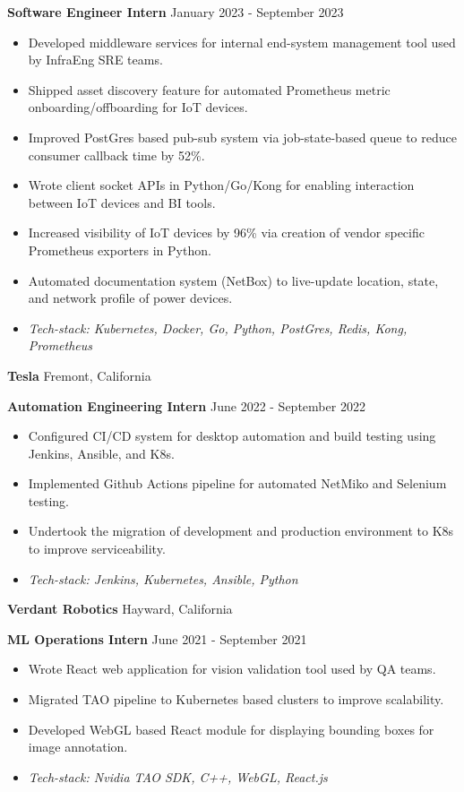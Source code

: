 \documentclass[11pt]{article}
\begin{document}
\textbf{Software Engineer Intern} \hfill January 2023 - September 2023
\begin{itemize}[noitemsep, topsep=0pt, partopsep=0pt, parsep=0pt]
    \item Developed middleware services for internal end-system management tool used by InfraEng SRE teams.
    \item Shipped asset discovery feature for automated Prometheus metric onboarding/offboarding for IoT devices. 
    \item Improved PostGres based pub-sub system via job-state-based queue to reduce consumer callback time by 52\%.
    \item Wrote client socket APIs in Python/Go/Kong for enabling interaction between IoT devices and BI tools.
    \item Increased visibility of IoT devices by 96\% via creation of vendor specific Prometheus exporters in Python.
    \item Automated documentation system (NetBox) to live-update location, state, and network profile of power devices.
    \item \textit{Tech-stack: Kubernetes, Docker, Go, Python, PostGres, Redis, Kong, Prometheus}
\end{itemize}

\vspace{8pt}

\textbf{Tesla} \hfill Fremont, California

\textbf{Automation Engineering Intern} \hfill June 2022 - September 2022
\begin{itemize}[noitemsep, topsep=0pt, partopsep=0pt, parsep=0pt]
    \item Configured CI/CD system for desktop automation and build testing using Jenkins, Ansible, and K8s.
    \item Implemented Github Actions pipeline for automated NetMiko and Selenium testing.
    \item Undertook the migration of development and production environment to K8s to improve serviceability.
    \item \textit{Tech-stack: Jenkins, Kubernetes, Ansible, Python}
\end{itemize}

\vspace{8pt}

\textbf{Verdant Robotics} \hfill Hayward, California

\textbf{ML Operations Intern} \hfill June 2021 - September 2021 
\begin{itemize}[noitemsep, topsep=0pt, partopsep=0pt, parsep=0pt]
    \item Wrote React web application for vision validation tool used by QA teams.
    \item Migrated TAO pipeline to Kubernetes based clusters to improve scalability.
    \item Developed WebGL based React module for displaying bounding boxes for image annotation.
    \item \textit{Tech-stack: Nvidia TAO SDK, C++, WebGL, React.js}
\end{itemize}
\end{document}
